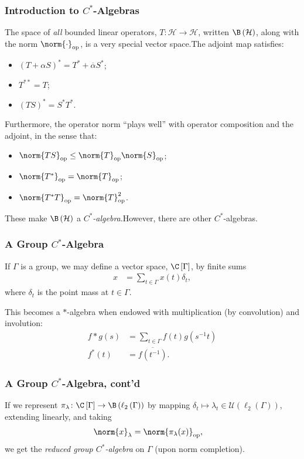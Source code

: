 \documentclass{beamer-custom}
\DeclareMathOperator{\op}{op}
\begin{document}
\begin{frame}
  \frametitle{Introduction to $C^{\ast}$-Algebras}
  \small
  The space of \textit{all} bounded linear operators, $T\colon \mathcal{H}\rightarrow \mathcal{H}$, written $\B\left( \mathcal{H} \right)$, along with the norm $\norm{\cdot}_{\op}$, is a very special vector space.\pause\:The adjoint map satisfies:\pause
  \begin{itemize}
    \item $\left( T + \alpha S \right)^{\ast} = T^{\ast} + \overline{\alpha} S^{\ast}$;\pause
    \item $T^{\ast\ast} = T$;\pause
    \item $\left( TS \right)^{\ast} = S^{\ast}T^{\ast}$.\pause
  \end{itemize}
  Furthermore, the operator norm ``plays well'' with operator composition and the adjoint, in the sense that:\pause
  \begin{itemize}
    \item $\norm{TS}_{\op}\leq \norm{T}_{\op}\norm{S}_{\op}$;\pause
    \item $\norm{T^{\ast}}_{\op}= \norm{T}_{\op}$;\pause
    \item $\norm{T^{\ast}T}_{\op} = \norm{T}^2_{\op}$.\pause
  \end{itemize}
  These make $\B\left( \mathcal{H} \right)$ a \textit{$C^{\ast}$-algebra}.\pause\:However, there are other $C^{\ast}$-algebras.
\end{frame}
\begin{frame}
  \frametitle{A Group $C^{\ast}$-Algebra}
  If $\Gamma$ is a group, we may define a vector space, $\C\left[ \Gamma \right]$, by finite sums
  \begin{align*}
    x &= \sum_{t\in\Gamma}x(t)\delta_t,
  \end{align*}
  where $\delta_t$ is the point mass at $t\in \Gamma$.\pause\newline

  This becomes a $\ast$-algebra when endowed with multiplication (by convolution) and involution:
  \begin{align*}
    f\ast g(s) &= \sum_{t\in\Gamma}f(t)g\left( s^{-1}t \right)\\
    f^{\ast}(t) &= \overline{f\left( t^{-1} \right)}.
  \end{align*}
\end{frame}
\begin{frame}
  \frametitle{A Group $C^{\ast}$-Algebra, cont'd}
  If we represent $\pi_{\lambda}\colon \C\left[ \Gamma \right]\rightarrow \B\left( \ell_2\left( \Gamma \right) \right)$ by mapping $\delta_t \mapsto \lambda_{t}\in \mathcal{U}\left( \ell_2\left( \Gamma \right) \right)$, extending linearly, and taking
  \begin{align*}
    \norm{x}_{\lambda} &= \norm{\pi_{\lambda}(x)}_{\op},
  \end{align*}
  we get the \textit{reduced group $C^{\ast}$-algebra} on $\Gamma$ (upon norm completion).
\end{frame}
\end{document}
